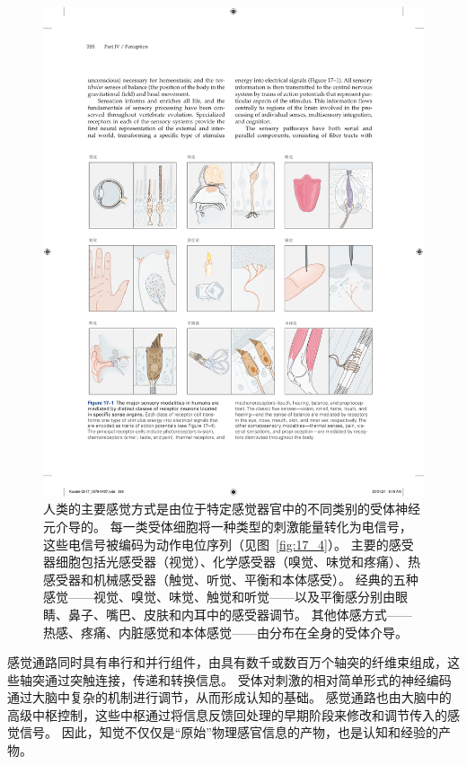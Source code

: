 \begin{figure}[htbp]
	\centering
	\includegraphics[width=1.0\linewidth]{chap17/fig_17_1}
	\caption{人类的主要感觉方式是由位于特定感觉器官中的不同类别的受体神经元介导的。 
		每一类受体细胞将一种类型的刺激能量转化为电信号，这些电信号被编码为动作电位序列（见图~\ref{fig:17_4}）。 
		主要的感受器细胞包括光感受器（视觉）、化学感受器（嗅觉、味觉和疼痛）、热感受器和机械感受器（触觉、听觉、平衡和本体感受）。 
		经典的五种感觉——视觉、嗅觉、味觉、触觉和听觉——以及平衡感分别由眼睛、鼻子、嘴巴、皮肤和内耳中的感受器调节。 
		其他体感方式——热感、疼痛、内脏感觉和本体感觉——由分布在全身的受体介导。}
	\label{fig:17_1}
\end{figure}



感觉通路同时具有串行和并行组件，由具有数千或数百万个轴突的纤维束组成，这些轴突通过突触连接，传递和转换信息。 
受体对刺激的相对简单形式的神经编码通过大脑中复杂的机制进行调节，从而形成认知的基础。 
感觉通路也由大脑中的高级中枢控制，这些中枢通过将信息反馈回处理的早期阶段来修改和调节传入的感觉信号。 
因此，知觉不仅仅是“原始”物理感官信息的产物，也是认知和经验的产物。



